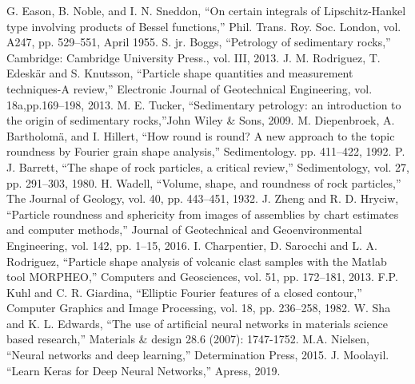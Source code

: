 \documentclass[conference]{IEEEtran}
\begin{document}
	
\begin{thebibliography}{plain}
 G. Eason, B. Noble, and I. N. Sneddon, ``On certain integrals of Lipschitz-Hankel type involving products of Bessel functions,'' Phil. Trans. Roy. Soc. London, vol. A247, pp. 529--551, April 1955.
 S. jr. Boggs, ``Petrology of sedimentary rocks,'' Cambridge: Cambridge University Press., vol. III, 2013.
 J. M. Rodriguez, T. Edesk{\"{a}}r and S. Knutsson, ``Particle shape quantities and measurement techniques-A review,'' Electronic Journal of Geotechnical Engineering, vol. 18a,pp.169--198, 2013.
 M. E. Tucker, ``Sedimentary petrology: an introduction to the origin of sedimentary rocks,''John Wiley \& Sons, 2009.
 M. Diepenbroek, A. Bartholom{\"{a}}, and I. Hillert, ``How round is round? A new approach to the topic  roundness by Fourier grain shape analysis,'' Sedimentology. pp. 411--422, 1992.
 P. J. Barrett, ``The shape of rock particles, a critical review,'' Sedimentology, vol. 27, pp. 291--303, 1980.
 H. Wadell, ``Volume, shape, and roundness of rock particles,'' The Journal of Geology, vol. 40, pp. 443--451, 1932.
 J. Zheng and R. D. Hryciw, ``Particle roundness and sphericity from images of assemblies by chart estimates and computer methods,'' Journal of Geotechnical and Geoenvironmental Engineering, vol. 142, pp. 1--15, 2016.
 I. Charpentier,  D. Sarocchi  and L. A. Rodriguez, ``Particle shape analysis of volcanic clast samples with the Matlab tool MORPHEO,'' Computers and Geosciences, vol. 51, pp. 172--181, 2013.
 F.P. Kuhl and C. R. Giardina, ``Elliptic Fourier features of a closed contour,'' Computer Graphics and Image Processing, vol. 18, pp. 236--258, 1982.
 W. Sha and K. L. Edwards, ``The use of artificial neural networks in materials science based research,'' Materials \& design 28.6 (2007): 1747-1752.
 M.A. Nielsen, ``Neural networks and deep learning,'' Determination Press, 2015.
 J. Moolayil. ``Learn Keras for Deep Neural Networks,'' Apress, 2019.

\end{thebibliography}

\end{document}
